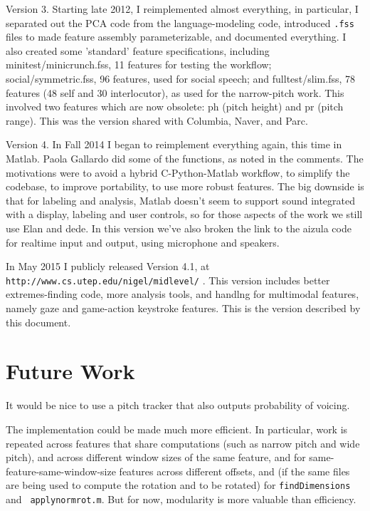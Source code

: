 \documentclass[11pt]{article}
\begin{document}
Version 3. Starting late 2012, I reimplemented almost everything, in
particular, I separated out the PCA code from the language-modeling
code, introduced {\tt .fss} files to made feature assembly
parameterizable, and documented everything.  I also created some
'standard' feature specifications, including minitest/minicrunch.fss,
11 features for testing the workflow; social/symmetric.fss, 96
features, used for social speech; and fulltest/slim.fss, 78 features
(48 self and 30 interlocutor), as used for the narrow-pitch work.
This involved two features which are now obsolete: ph (pitch height)
and pr (pitch range).  This was the version shared with Columbia,
Naver, and Parc.

Version 4.  In Fall 2014 I began to reimplement everything again, this
time in Matlab.  Paola Gallardo did some of the functions, as noted in
the comments.  The motivations were to avoid a hybrid C-Python-Matlab
workflow, to simplify the codebase, to improve portability, to use
more robust features.  The big downside is that for labeling and
analysis, Matlab doesn't seem to support sound integrated with a
display, labeling and user controls, so for those aspects of the work
we still use Elan and dede.  In this version we've also broken the
link to the aizula code for realtime input and output, using
microphone and speakers.

In May 2015 I publicly released Version 4.1, at {\tt
  http://www.cs.utep.edu/nigel/midlevel/} .  This version includes
better extremes-finding code, more analysis tools, and handlng for
multimodal features, namely gaze and game-action keystroke features.
This is the version described by this document.


\section{Future Work}

It would be nice to use a pitch tracker that also outputs probability
of voicing.

The implementation could be made much more efficient.  In particular,
work is repeated across features that share computations (such as
narrow pitch and wide pitch), and across different window sizes of the
same feature, and for same-feature-same-window-size features across
different offsets, and (if the same files are being used to compute
the rotation and to be rotated) for {\tt findDimensions} and {\tt
  applynormrot.m}.  But for now, modularity is more valuable than
efficiency.
\end{document}
